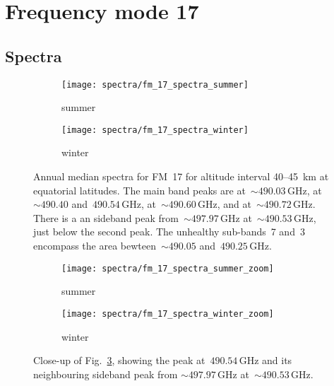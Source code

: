 \section{Frequency mode 17}
\label{FM17}

\subsection{Spectra}
\label{FM17:spectra}

\begin{figure}[ht]
    \centering
    \begin{subfigure}[b]{0.9545\textwidth}
        \texttt{[image: spectra/fm\_17\_spectra\_summer]}
        \caption{summer}\label{fig:spectra:17:summer}
    \end{subfigure}
    \begin{subfigure}[b]{0.9545\textwidth}
        \texttt{[image: spectra/fm\_17\_spectra\_winter]}
        \caption{winter}\label{fig:spectra:17:winter}
    \end{subfigure}
    \caption{Annual median spectra for FM~17 for altitude interval 40--45~km
        at equatorial latitudes.  The main band peaks are 
        at~$\sim490.03\,\mathrm{GHz}$, 
        at~$\sim490.40$ and~$490.54\,\mathrm{GHz}$, 
        at~$\sim490.60\,\mathrm{GHz}$, and 
        at~$\sim490.72\,\mathrm{GHz}$.  There is a an  sideband peak
        from~$\sim497.97\,\mathrm{GHz}$ at~$\sim490.53\,\mathrm{GHz}$, just
        below the second  peak.  The unhealthy sub-bands~7 and~3
        encompass the area bewteen~$\sim490.05$ and~$490.25\,\mathrm{GHz}$.
        }\label{fig:spectra:17}
\end{figure}

\begin{figure}[ht]
    \centering
    \begin{subfigure}[b]{0.9545\textwidth}
        \texttt{[image: spectra/fm\_17\_spectra\_summer\_zoom]}
        \caption{summer}\label{fig:spectra:17:summer:closeup}
    \end{subfigure}
    \begin{subfigure}[b]{0.9545\textwidth}
        \texttt{[image: spectra/fm\_17\_spectra\_winter\_zoom]}
        \caption{winter}\label{fig:spectra:17:winter:closeup}
    \end{subfigure}
    \caption{Close-up of Fig.~\ref{fig:spectra:17}, showing the 
        peak at~$490.54\,\mathrm{GHz}$ and its neighbouring  sideband
        peak from $\sim497.97\,\mathrm{GHz}$ at~$\sim490.53\,\mathrm{GHz}$.
        }\label{fig:spectra:17:closeup}
\end{figure}

